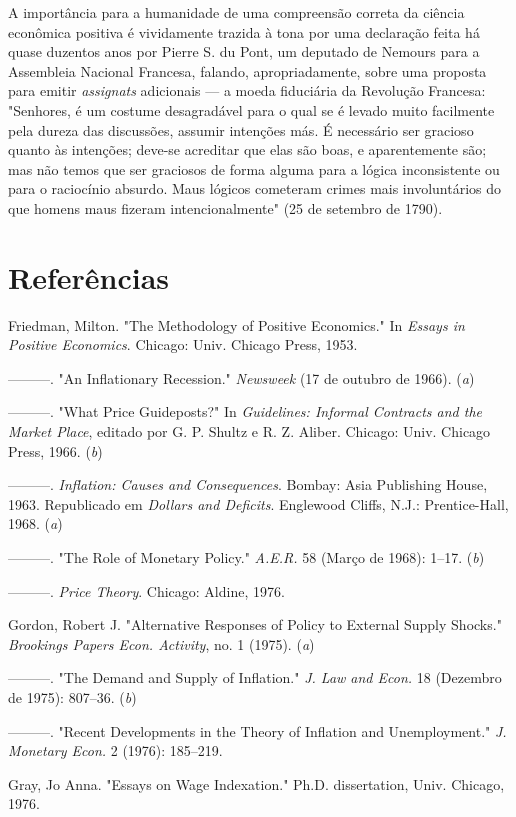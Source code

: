 \documentclass[12pt]{article}
\begin{document}
A importância para a humanidade de uma compreensão correta da ciência econômica positiva é vividamente trazida à tona por uma declaração feita há quase duzentos anos por Pierre S. du Pont, um deputado de Nemours para a Assembleia Nacional Francesa, falando, apropriadamente, sobre uma proposta para emitir \textit{assignats} adicionais — a moeda fiduciária da Revolução Francesa: "Senhores, é um costume desagradável para o qual se é levado muito facilmente pela dureza das discussões, assumir intenções más. É necessário ser gracioso quanto às intenções; deve-se acreditar que elas são boas, e aparentemente são; mas não temos que ser graciosos de forma alguma para a lógica inconsistente ou para o raciocínio absurdo. Maus lógicos cometeram crimes mais involuntários do que homens maus fizeram intencionalmente" (25 de setembro de 1790).

\section*{Referências}

Friedman, Milton. "The Methodology of Positive Economics." In \textit{Essays in Positive Economics}. Chicago: Univ. Chicago Press, 1953.

———. "An Inflationary Recession." \textit{Newsweek} (17 de outubro de 1966). (\textit{a})

———. "What Price Guideposts?" In \textit{Guidelines: Informal Contracts and the Market Place}, editado por G. P. Shultz e R. Z. Aliber. Chicago: Univ. Chicago Press, 1966. (\textit{b})

———. \textit{Inflation: Causes and Consequences}. Bombay: Asia Publishing House, 1963. Republicado em \textit{Dollars and Deficits}. Englewood Cliffs, N.J.: Prentice-Hall, 1968. (\textit{a})

———. "The Role of Monetary Policy." \textit{A.E.R.} 58 (Março de 1968): 1–17. (\textit{b})

———. \textit{Price Theory}. Chicago: Aldine, 1976.

Gordon, Robert J. "Alternative Responses of Policy to External Supply Shocks." \textit{Brookings Papers Econ. Activity}, no. 1 (1975). (\textit{a})

———. "The Demand and Supply of Inflation." \textit{J. Law and Econ.} 18 (Dezembro de 1975): 807–36. (\textit{b})

———. "Recent Developments in the Theory of Inflation and Unemployment." \textit{J. Monetary Econ.} 2 (1976): 185–219.

Gray, Jo Anna. "Essays on Wage Indexation." Ph.D. dissertation, Univ. Chicago, 1976.
\end{document}

